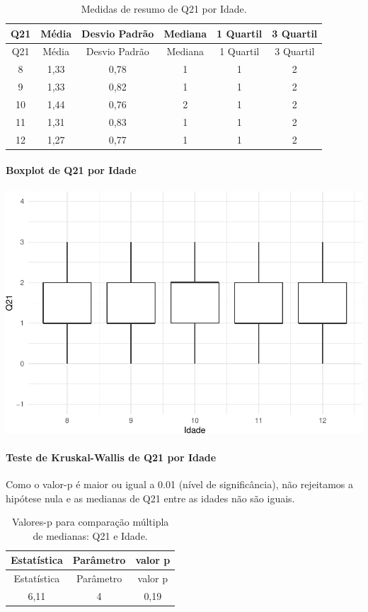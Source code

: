 \documentclass[]{article}
\let\oldparagraph\paragraph
\renewcommand{\paragraph}[1]{\oldparagraph{#1}\mbox{}}
\begin{document}
\begin{longtable}[]{@{}cccccc@{}}
\caption{\label{tab:unnamed-chunk-449}Medidas de resumo de Q21 por Idade.}\tabularnewline
\toprule
Q21 & Média & Desvio Padrão & Mediana & 1 Quartil & 3 Quartil\tabularnewline
\midrule
\endfirsthead
\toprule
Q21 & Média & Desvio Padrão & Mediana & 1 Quartil & 3 Quartil\tabularnewline
\midrule
\endhead
8 & 1,33 & 0,78 & 1 & 1 & 2\tabularnewline
9 & 1,33 & 0,82 & 1 & 1 & 2\tabularnewline
10 & 1,44 & 0,76 & 2 & 1 & 2\tabularnewline
11 & 1,31 & 0,83 & 1 & 1 & 2\tabularnewline
12 & 1,27 & 0,77 & 1 & 1 & 2\tabularnewline
\bottomrule
\end{longtable}

\hypertarget{boxplot-de-q21-por-idade}{%
\paragraph{Boxplot de Q21 por Idade}\label{boxplot-de-q21-por-idade}}

\begin{center}\includegraphics[width=0.75\linewidth]{relatorio_covid19_files/figure-latex/unnamed-chunk-450-1} \end{center}

\hypertarget{teste-de-kruskal-wallis-de-q21-por-idade}{%
\paragraph{Teste de Kruskal-Wallis de Q21 por Idade}\label{teste-de-kruskal-wallis-de-q21-por-idade}}

Como o valor-p é maior ou igual a 0.01 (nível de significância), não rejeitamos a hipótese nula e as medianas de Q21 entre as idades não são iguais.

\begin{longtable}[]{@{}ccc@{}}
\caption{\label{tab:unnamed-chunk-452}Valores-p para comparação múltipla de medianas: Q21 e Idade.}\tabularnewline
\toprule
Estatística & Parâmetro & valor p\tabularnewline
\midrule
\endfirsthead
\toprule
Estatística & Parâmetro & valor p\tabularnewline
\midrule
\endhead
6,11 & 4 & 0,19\tabularnewline
\bottomrule
\end{longtable}
\end{document}
